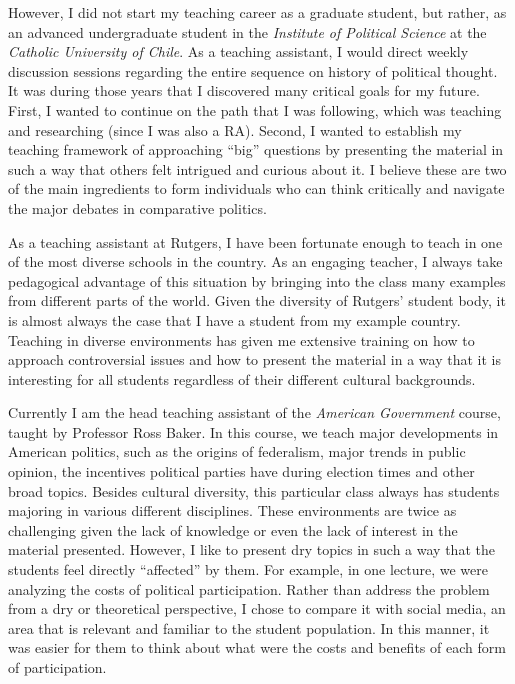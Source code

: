 \documentclass[11pt]{letter} %
\begin{document}
\begin{letter}{}
However, I did not start my teaching career as a graduate student, but rather, as an advanced undergraduate student in the \emph{Institute of Political Science} at the \emph{Catholic University of Chile}. As a teaching assistant, I would direct weekly discussion sessions regarding the entire sequence on history of political thought. It was during those years that I discovered many critical goals for my future. First, I wanted to continue on the path that I was following, which was teaching and researching (since I was also a RA). Second, I wanted to establish my teaching framework of approaching ``big'' questions by presenting the material in such a way that others felt intrigued and curious about it. I believe these are two of the main ingredients to form individuals who can think critically and navigate the major debates in comparative politics. 

As a teaching assistant at Rutgers, I have been fortunate enough to teach in one of the most diverse schools in the country. As an engaging teacher, I always take pedagogical advantage of this situation by bringing into the class many examples from different parts of the world. Given the diversity of Rutgers' student body, it is almost always the case that I have a student from my example country. Teaching in diverse environments has given me extensive training on how to approach controversial issues and how to present the material in a way that it is interesting for all students regardless of their different cultural backgrounds. 

Currently I am the head teaching assistant of the \emph{American Government} course, taught by Professor Ross Baker. In this course, we teach major developments in American politics, such as the origins of federalism, major trends in public opinion, the incentives political parties have during election times and other broad topics. Besides cultural diversity, this particular class always has students majoring in various different disciplines. These environments are twice as challenging given the lack of knowledge or even the lack of interest in the material presented. However, I like to present dry topics in such a way that the students feel directly ``affected'' by them. For example, in one lecture, we were analyzing the costs of political participation. Rather than address the problem from a dry or theoretical perspective, I chose to compare it with social media, an area that is relevant and familiar to the student population. In this manner, it was easier for them to think about what were the costs and benefits of each form of participation. 


\end{letter}
\end{document}
